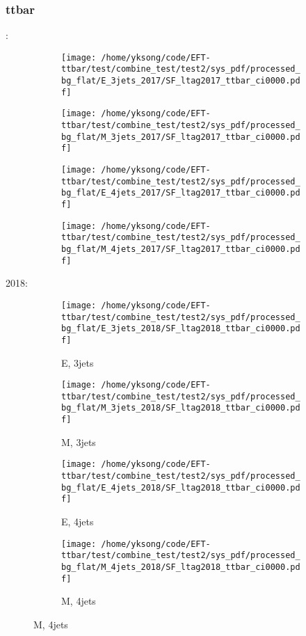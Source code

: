 \documentclass{beamer}
\begin{document}
\begin{frame}
\frametitle{ttbar}
\fontsize{5}{1}:
\begin{figure}
\centering
\begin{subfigure}[b]{0.24\textwidth}
\texttt{[image: /home/yksong/code/EFT-ttbar/test/combine\_test/test2/sys\_pdf/processed\_bg\_flat/E\_3jets\_2017/SF\_ltag2017\_ttbar\_ci0000.pdf]}
\end{subfigure}
\begin{subfigure}[b]{0.24\textwidth}
\texttt{[image: /home/yksong/code/EFT-ttbar/test/combine\_test/test2/sys\_pdf/processed\_bg\_flat/M\_3jets\_2017/SF\_ltag2017\_ttbar\_ci0000.pdf]}
\end{subfigure}
\begin{subfigure}[b]{0.24\textwidth}
\texttt{[image: /home/yksong/code/EFT-ttbar/test/combine\_test/test2/sys\_pdf/processed\_bg\_flat/E\_4jets\_2017/SF\_ltag2017\_ttbar\_ci0000.pdf]}
\end{subfigure}
\begin{subfigure}[b]{0.24\textwidth}
\texttt{[image: /home/yksong/code/EFT-ttbar/test/combine\_test/test2/sys\_pdf/processed\_bg\_flat/M\_4jets\_2017/SF\_ltag2017\_ttbar\_ci0000.pdf]}
\end{subfigure}
\end{figure}
2018:
\begin{figure}
\centering
\begin{subfigure}[b]{0.24\textwidth}
\texttt{[image: /home/yksong/code/EFT-ttbar/test/combine\_test/test2/sys\_pdf/processed\_bg\_flat/E\_3jets\_2018/SF\_ltag2018\_ttbar\_ci0000.pdf]}
\captionsetup{font=tiny}
\caption{E, 3jets}
\end{subfigure}
\begin{subfigure}[b]{0.24\textwidth}
\texttt{[image: /home/yksong/code/EFT-ttbar/test/combine\_test/test2/sys\_pdf/processed\_bg\_flat/M\_3jets\_2018/SF\_ltag2018\_ttbar\_ci0000.pdf]}
\captionsetup{font=tiny}
\caption{M, 3jets}
\end{subfigure}
\begin{subfigure}[b]{0.24\textwidth}
\texttt{[image: /home/yksong/code/EFT-ttbar/test/combine\_test/test2/sys\_pdf/processed\_bg\_flat/E\_4jets\_2018/SF\_ltag2018\_ttbar\_ci0000.pdf]}
\captionsetup{font=tiny}
\caption{E, 4jets}
\end{subfigure}
\begin{subfigure}[b]{0.24\textwidth}
\texttt{[image: /home/yksong/code/EFT-ttbar/test/combine\_test/test2/sys\_pdf/processed\_bg\_flat/M\_4jets\_2018/SF\_ltag2018\_ttbar\_ci0000.pdf]}
\captionsetup{font=tiny}
\caption{M, 4jets}
\end{subfigure}
\end{figure}
\end{frame}
\end{document}
